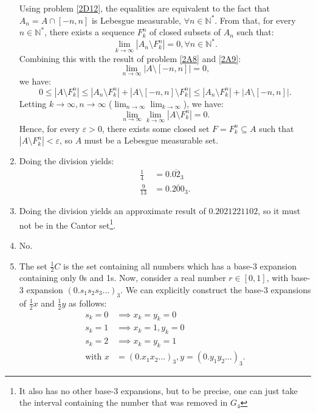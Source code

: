\begin{enumerate}[label=\textbf{2D.\arabic*}]
  Using problem \ref{2D12}, the equalities are equivalent to the fact that \(
  A_{n} = A \cap [-n, n]
  \) is Lebesgue measurable, \( \forall n \in \mathbb{N}^{*} \).
  From that, for every \( n \in \mathbb{N}^{*} \), there exists a sequence \(
  F^{n}_{k}\) of closed subsets of \( A_{n} \) such that:
  \[
    \lim_{k \to \infty} |A_{n} \setminus F^{n}_{k}| = 0, \forall n \in
    \mathbb{N}^{*}
  .\] 
  Combining this with the result of problem \ref{2A8} and \ref{2A9}:
  \[
    \lim_{n \to \infty} |A \setminus [-n, n]| = 0
  ,\] we have:
  \[
    0 \le |A \setminus F^{n}_{k}| \le |A_{n} \setminus F^{n}_{k}| + |A \setminus
    [-n, n] \setminus F^{n}_{k}| \le |A_{n} \setminus F^{n}_{k}| + |A \setminus
    [-n, n]|
  .\] 
  Letting \( k \to \infty, n \to \infty \) (\( \lim_{n \to \infty} \lim_{k \to
  \infty}  \)), we have:
  \[
    \lim_{n \to \infty} \lim_{k \to \infty} |A \setminus F^{n}_{k}| = 0
  .\] 
  Hence, for every \( \varepsilon > 0 \), there exists some closed set \( F =
  F^{n}_{k} \subseteq A \) such that \( |A \setminus F^{n}_{k}| < \varepsilon
  \), so \( A \) must be a Lebesgue measurable set.
\item Doing the division yields:
  \begin{align*}
    \frac{1}{4} &= 0.\overline{02}_{3}\\
    \frac{9}{13} &= 0.\overline{200}_{3}
  .\end{align*}
\item Doing the division yields an approximate result of \( 0.2021221102 \),
  so it must not be in the Cantor set\footnote{It also has no other base-3
  expansions, but to be precise, one can just take the interval containing the
number that was removed in \( G_{4} \)}.
\item No.
\item The set \( \frac{1}{2}C \) is the set containing all numbers which has a
  base-3 expansion containing only 0s and 1s. Now, consider a real number \( r
  \in [0, 1] \), with base-3 expansion \( (0.s_{1}s_{2}s_{3}\ldots )_{3} \). We
  can explicitly construct the base-3 expansions of \( \frac{1}{2}x \) and \(
  \frac{1}{2}y \) as follows:
  \begin{align*}
    s_{k} = 0 &\implies x_{k} = y_{k} = 0\\
    s_{k} = 1 &\implies x_{k} = 1, y_{k} = 0\\
    s_{k} = 2 &\implies x_{k} = y_{k} = 1\\
    \text{with } x &= (0.x_{1}x_{2}\ldots )_{3}, y = (0.y_{1}y_{2}\ldots )_{3}
  .\end{align*}


\end{enumerate}
